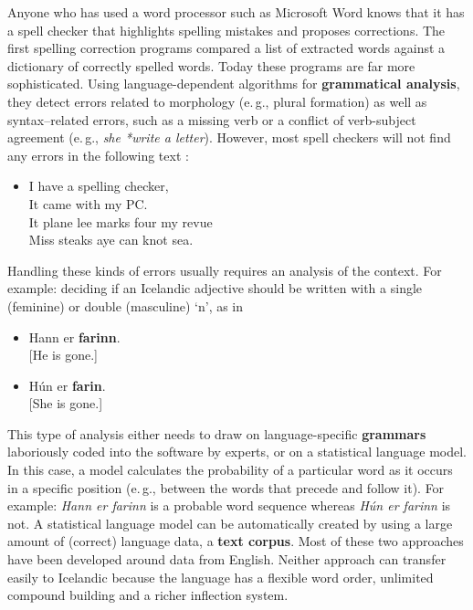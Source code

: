 \begin{multicols}{2}
Anyone who has used a word processor such as Microsoft Word knows that it has a spell checker that highlights spelling mistakes and proposes corrections. The first spelling correction programs compared a list of extracted words against a dictionary of correctly spelled words. Today these programs are far more sophisticated. Using language-dependent algorithms for \textbf{grammatical analysis}, they detect errors related to morphology (e.\,g., plural formation) as well as syntax--related errors, such as a missing verb or a conflict of verb-subject agreement (e.\,g., \textit{she *write a letter}). However, most spell checkers will not find any errors in the following text \cite{zar1}:

\begin{itemize}
\item[] I have a spelling checker,\\
  It came with my PC.\\
  It plane lee marks four my revue\\
  Miss steaks aye can knot sea.
\end{itemize}

Handling these kinds of errors usually requires an analysis of the context. For example: deciding if an Icelandic adjective should be written with a single (feminine) or double (masculine) ‘n’, as in

\begin{itemize}
\item Hann er \textbf{farinn}.\\
  {[}He is gone.{]} 
\item Hún er \textbf{farin}.\\
  {[}She is gone.{]}
\end{itemize}

This type of analysis either needs to draw on language-specific \textbf{grammars} laboriously coded into the software by experts, or on a statistical language model. In this case, a model calculates the probability of a particular word as it occurs in a specific position (e.\,g., between the words that precede and follow it). For example: \textit{Hann er farinn} is a probable word sequence whereas \textit{Hún er farinn} is not. A statistical language model can be automatically created by using a large amount of (correct) language data, a \textbf{text corpus}. Most of these two approaches have been developed around data from English. Neither approach can transfer easily to Icelandic because the language has a flexible word order, unlimited compound building and a richer inflection system.



\end{multicols}
